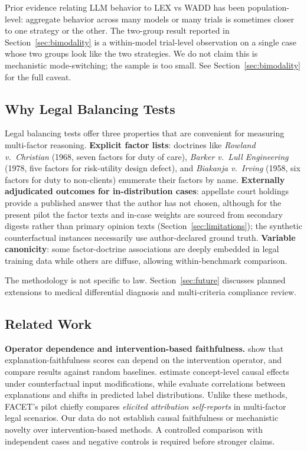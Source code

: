 \documentclass[11pt]{article}
\begin{document}
Prior evidence relating LLM behavior to LEX vs WADD has been population-level: aggregate behavior across many models or many trials is sometimes closer to one strategy or the other. The two-group result reported in Section~\ref{sec:bimodality} is a within-model trial-level observation on a single case whose two groups look like the two strategies. We do not claim this is mechanistic mode-switching; the sample is too small. See Section~\ref{sec:bimodality} for the full caveat.

\subsection{Why Legal Balancing Tests}

Legal balancing tests offer three properties that are convenient for measuring multi-factor reasoning. \textbf{Explicit factor lists}: doctrines like \emph{Rowland v.\ Christian} (1968, seven factors for duty of care), \emph{Barker v.\ Lull Engineering} (1978, five factors for risk-utility design defect), and \emph{Biakanja v.\ Irving} (1958, six factors for duty to non-clients) enumerate their factors by name. \textbf{Externally adjudicated outcomes for in-distribution cases}: appellate court holdings provide a published answer that the author has not chosen, although for the present pilot the factor texts and in-case weights are sourced from secondary digests rather than primary opinion texts (Section~\ref{sec:limitations}); the synthetic counterfactual instances necessarily use author-declared ground truth. \textbf{Variable canonicity}: some factor-doctrine associations are deeply embedded in legal training data while others are diffuse, allowing within-benchmark comparison.

The methodology is not specific to law. Section~\ref{sec:future} discusses planned extensions to medical differential diagnosis and multi-criteria compliance review.

\subsection{Related Work}

\textbf{Operator dependence and intervention-based faithfulness.} \citet{basu2026ice} show that explanation-faithfulness scores can depend on the intervention operator, and compare results against random baselines. \citet{matton2025walk} estimate concept-level causal effects under counterfactual input modifications, while \citet{siegel2024probabilities} evaluate correlations between explanations and shifts in predicted label distributions. Unlike these methods, FACET's pilot chiefly compares \emph{elicited attribution self-reports} in multi-factor legal scenarios. Our data do not establish causal faithfulness or mechanistic novelty over intervention-based methods. A controlled comparison with independent cases and negative controls is required before stronger claims.
\end{document}
